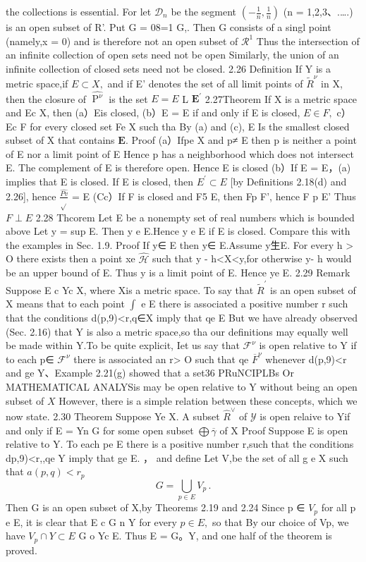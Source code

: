 the collections is essential. For let ${\mathcal{D}}_{n}$ be the segment $\left(-{\frac{1}{n}},{\frac{1}{n}}\right)$ (n = 1,2,3、.….) is an open subset of R'. Put G = 08=1 G,. Then G consists of a singl point (namely,x = 0) and is therefore not an open subset of $\textstyle{\mathcal{R}}^{1}$ Thus the intersection of an infinite collection of open sets need not be open Similarly, the union of an infinite collection of closed sets need not be closed. 2.26 Definition If Y is a metric space,if $E\subset X,$ and if E' denotes the set of all limit points of ${\widetilde{R}}^{\nu}$ in X, then the closure of ${\widehat{\operatorname{P}^{\nu}}}$ is the set $\scriptstyle{E=E}$ L ${\boldsymbol{E}}^{\prime}$ 2.27Theorem If X is a metric space and Ec X, then (a）Eis closed, (b）E = E if and only if E is closed, $E\in F,$ c）Ec F for every closed set Fe X such tha By (a) and (c), E Is the smallest closed subset of X that contains ${\boldsymbol{E}}.$ Proof (a）Ifpe X and p≠ E then p is neither a point of E nor a limit point of E Hence p has a neighborhood which does not intersect E. The complement of E is therefore open. Hence E is closed (b）If E = E，(a) implies that E is closed. If E is closed, then $E^{\prime}\subset E$ [by Definitions 2.18(d) and 2.26], hence $\frac{\widehat{P v}}{\sqrt{}}$ = E (Cc）If F is closed and F5 E, then Fp F', hence F p E’ Thus $F\perp E$ 2.28 Thcorem Let E be a nonempty set of real numbers which is bounded above Let y = sup E. Then y e E.Hence y e E if E is closed. Compare this with the examples in Sec. 1.9. Proof If y∈ E then y∈ E.Assume y生E. For every h > O there exists then a point xe ${\widehat{\mathcal{H}}}$ such that y - h<X<y,for otherwise y- h would be an upper bound of E. Thus y is a limit point of E. Hence ye E. 2.29 Remark Suppose E c Yc X, where Xis a metric space. To say that ${\widetilde{R}}^{\prime}$ is an open subset of X means that to each point $\textstyle{\int}$ e E there is associated a positive number r such that the conditions d(p,9)<r,q∈X imply that qe E But we have already observed (Sec. 2.16) that Y is also a metric space,so tha our definitions may equally well be made within Y.To be quite explicit, Iet us say that ${\mathcal{F}}^{\nu}$ is open relative to Y if to each p∈ ${\mathcal{F}}^{\nu}$ there is associated an r> O such that qe ${\overline{{F}}}^{\nu}$ whenever d(p,9)<r and ge Y、Example 2.21(g) showed that a set36 PRuNCIPLBs Or MATHEMATICAL ANALYSis may be open relative to Y without being an open subset of $X$ However, there is a simple relation between these concepts, which we now state. 2.30 Theorem Suppose Ye X. A subset $\widehat{R}^{\vee}$ of $\textstyle{\mathcal{Y}}$ is open relaive to Yif and only if E = Yn G for some open subset $\bigoplus{\overline{{\gamma}}}$ of X Proof Suppose E is open relative to Y. To each pe E there is a positive number r,such that the conditions dp,9)<r,,qe Y imply that ge E. ， and define Let V,be the set of all g e X such that $a(p,q)<r_{p}$ $$ G=\bigcup_{p\in E}V_{p}\,. $$ Then G is an open subset of X,by Theorems 2.19 and 2.24 Since p ∈ ${\mathit{V}}_{p}$ for all p e E, it is clear that E c G n Y for every $p\in E,$ so that By our choice of Vp, we have $V_{p}\cap Y\subset E$ G o Yc E. Thus E = G。Y, and one half of the theorem is proved. 